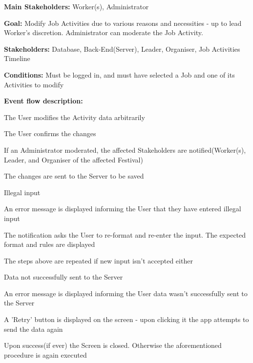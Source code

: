 			\noindent {}
			\begin{packed_item}
				\item \textbf{Main Stakeholders:} Worker(s), Administrator
				\item \textbf{Goal:} Modify Job Activities due to various reasons and necessities - up to lead Worker's discretion. Administrator can moderate the Job Activity.
				\item \textbf{Stakeholders: } Database, Back-End(Server), Leader, Organiser, Job Activities Timeline
				\item \textbf{Conditions: } Must be logged in, and must have selected a Job and one of its Activities to modify
				\item \textbf{Event flow description: }
				\begin{packed_enum}
					\item The User modifies the Activity data arbitrarily
					\item The User confirms the changes
					\item If an Administrator moderated, the affected Stakeholders are notified(Worker(s), Leader, and Organiser of the affected Festival)
					\item The changes are sent to the Server to be saved
				\end{packed_enum}
				
				\begin{packed_item}
					\item[1.a] Illegal input
					\item[] \begin{packed_enum}
						\item An error message is displayed informing the User that they have entered illegal input
						\item The notification asks the User to re-format and re-enter the input. The expected format and rules are displayed
						\item The steps above are repeated if new input isn't accepted either
					\end{packed_enum}
					
					\item[4.a] Data not successfully sent to the Server
					\item[] \begin{packed_enum}
						\item An error message is displayed informing the User data wasn't successfully sent to the Server
						\item A 'Retry' button is displayed on the screen - upon clicking it the app attempts to send the data again
						\item Upon success(if ever) the Screen is closed. Otherwise the aforementioned procedure is again executed
					\end{packed_enum}
				\end{packed_item}
			\end{packed_item}
			
